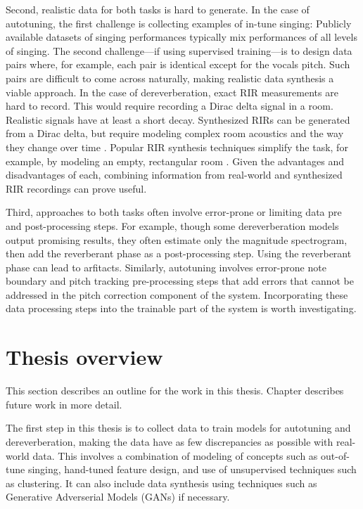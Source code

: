 Second, realistic data for both tasks is hard to generate. In the case of autotuning, the first challenge is collecting examples of in-tune singing: Publicly available datasets of singing performances typically mix performances of all levels of singing. The second challenge---if using supervised training---is to design data pairs where, for example, each pair is identical except for the vocals pitch. Such pairs are difficult to come across naturally, making realistic data synthesis a viable approach. In the case of dereverberation, exact RIR measurements are hard to record. This would require recording a Dirac delta signal in a room. Realistic signals have at least a short decay. Synthesized RIRs can be generated from a Dirac delta, but require modeling complex room acoustics and the way they change over time \cite{faller2019modifying, cecchi2018room}. Popular RIR synthesis techniques simplify the task, for example, by modeling an empty, rectangular room \cite{allen1979image}. Given the advantages and disadvantages of each, combining information from real-world and synthesized RIR recordings can prove useful.

Third, approaches to both tasks often involve error-prone or limiting data pre and post-processing steps. For example, though some dereverberation models output promising results, they often estimate only the magnitude spectrogram, then add the reverberant phase as a post-processing step. Using the reverberant phase can lead to arfitacts. Similarly, autotuning involves error-prone note boundary and pitch tracking pre-processing steps that add errors that cannot be addressed in the pitch correction component of the system. Incorporating these data processing steps into the trainable part of the system is worth investigating.

\section{Thesis overview}
This section describes an outline for the work in this thesis. Chapter describes future work in more detail. 

The first step in this thesis is to collect data to train models for autotuning and dereverberation, making the data have as few discrepancies as possible with real-world data. This involves a combination of modeling of concepts such as out-of-tune singing, hand-tuned feature design, and use of unsupervised techniques such as clustering. It can also include data synthesis using techniques such as Generative Adverserial Models (GANs) if necessary. 

